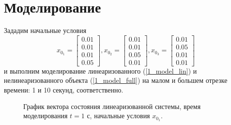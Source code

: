 \section{Моделирование}

Зададим начальные условия $$x_{0_1} = \begin{bmatrix}
     0.01\\
    0.01\\
    0.01\\
    0.05
\end{bmatrix},  x_{0_2} = \begin{bmatrix}
    0.01\\
    0.01\\
    0.05\\
    0.01
\end{bmatrix},  x_{0_3} = \begin{bmatrix}
    0.01\\
    0.05\\
    0.01\\
    0.01
\end{bmatrix}$$
и выполним моделирование линеаризованного (\ref{1_model_lin}) и нелинеаризованного объекта (\ref{1_model_full}) на малом и большем отрезке времени: 1 и 10 секунд, соответственно.


\begin{figure}[!h]
\caption{График вектора состояния линеаризованной системы, время моделирования $t=1$ с, начальные условия $x_{0_1}$.}
\label{2_x_lin_01_sm}
\end{figure}

